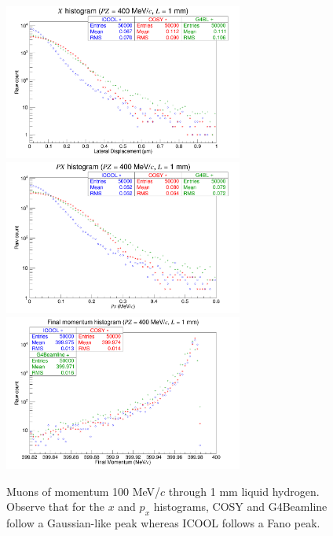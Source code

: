 \begin{figure}[H]
  \centering
    \includegraphics[width=0.7\textwidth]{Benchmarking/LH/X.400.1.png} 
    \includegraphics[width=0.7\textwidth]{Benchmarking/LH/PX.400.1.png} 
    \includegraphics[width=0.7\textwidth]{Benchmarking/LH/strag.400.1.png} 
  \caption[Muons of momentum 100 MeV/$c$ through 1 mm liquid hydrogen.]{Muons of momentum 100 MeV/$c$ through 1 mm liquid hydrogen. Observe that for the $x$ and $p_x$ histograms, COSY and G4Beamline follow a Gaussian-like peak whereas ICOOL follows a Fano peak.}
  \label{fig:400.1}
\end{figure}

